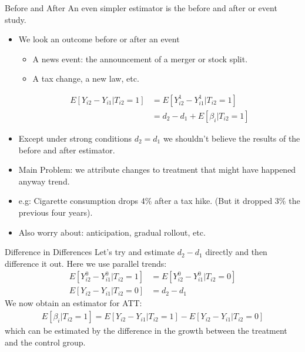 \begin{frame}{Before and After} 
An even simpler estimator is the \alert{before and after} or \alert{event study}.
\begin{itemize}
\item We look an outcome before or after an event
\begin{itemize}
\item A news event: the announcement of a merger or stock split.
\item A tax change, a new law, etc.
\end{itemize}
\begin{align*}
E[Y_{i2} - Y_{i1} | T_{i2}=1] & = E[Y_{i2}^1 - Y_{i1}^1 | T_{i2}=1] \\
 &= d_2-d_1 + E[\beta_{i}| T_{i2}=1] 
\end{align*}
\item Except under strong conditions $d_2 = d_1$ we shouldn't believe the results of the before and after estimator.
\item Main Problem: we attribute changes to treatment that might have happened anyway \alert{trend}.
\item e.g: Cigarette consumption drops 4\% after a tax hike. (But it dropped 3\% the previous four years).
\item Also worry about: \alert{anticipation}, \alert{gradual rollout}, etc.
\end{itemize}
\end{frame}

\begin{frame}{Difference in Differences} 
Let's try and estimate $d_2- d_1$ directly and then difference it out. Here we use \alert{parallel trends}:
\begin{align*}
E[Y_{i2}^0 - Y_{i1}^0 | T_{i2}=1]  &= E[Y_{i2}^0 - Y_{i1}^0 | T_{i2}=0] \\
E[Y_{i2} - Y_{i1} | T_{i2}=0] & = d_2-d_1
\end{align*}
We now obtain an estimator for ATT:
\begin{align*}
E[\beta_{i}| T_{i2}=1]  = E[Y_{i2} - Y_{i1} | T_{i2}=1] - E[Y_{i2} - Y_{i1} | T_{i2}=0]  
\end{align*}
which can be estimated by the difference in the growth between the treatment and the control group.
\end{frame}

